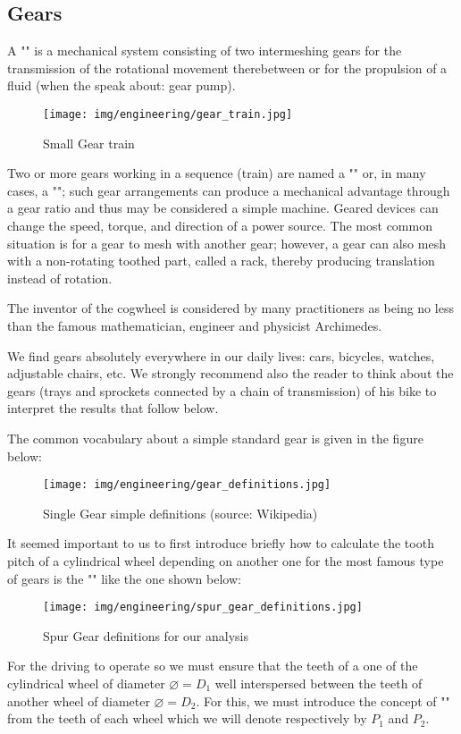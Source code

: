 	\subsection{Gears}
	A "" is a mechanical system consisting of two intermeshing gears for the transmission of the rotational movement therebetween or for the propulsion of a fluid (when the speak about: gear pump).
	\begin{figure}[H]
		\centering
		\texttt{[image: img/engineering/gear\_train.jpg]}	
		\caption{Small Gear train}
	\end{figure}
	
	Two or more gears working in a sequence (train) are named a "" or, in many cases, a ""; such gear arrangements can produce a mechanical advantage through a gear ratio and thus may be considered a simple machine. Geared devices can change the speed, torque, and direction of a power source. The most common situation is for a gear to mesh with another gear; however, a gear can also mesh with a non-rotating toothed part, called a rack, thereby producing translation instead of rotation.
	
	The inventor of the cogwheel is considered by many practitioners as being no less than the famous mathematician, engineer and physicist Archimedes.
	
	We find gears absolutely everywhere in our daily lives: cars, bicycles, watches, adjustable chairs, etc. We strongly recommend also the reader to think about the gears (trays and sprockets connected by a chain of transmission) of his bike to interpret the results that follow below.
	
	The common vocabulary about a simple standard gear is given in the figure below:
	\begin{figure}[H]
		\begin{center}
			\texttt{[image: img/engineering/gear\_definitions.jpg]}
		\end{center}	
		\caption{Single Gear simple definitions (source: Wikipedia)}
	\end{figure}
	It seemed important to us to first introduce briefly how to calculate the tooth pitch of a cylindrical wheel depending on another one for the most famous type of gears is the "" like the one shown below:
	\begin{figure}[H]
		\begin{center}
			\texttt{[image: img/engineering/spur\_gear\_definitions.jpg]}
		\end{center}	
		\caption[]{Spur Gear definitions for our analysis}
	\end{figure}
	For the driving to operate so we must ensure that the teeth of a one of the cylindrical wheel of diameter $\varnothing=D_1$ well interspersed between the teeth of another wheel of diameter $\varnothing=D_2$. For this, we must introduce the concept of "" from the teeth of each wheel which we will denote respectively by $P_1$ and $P_2$.
	
